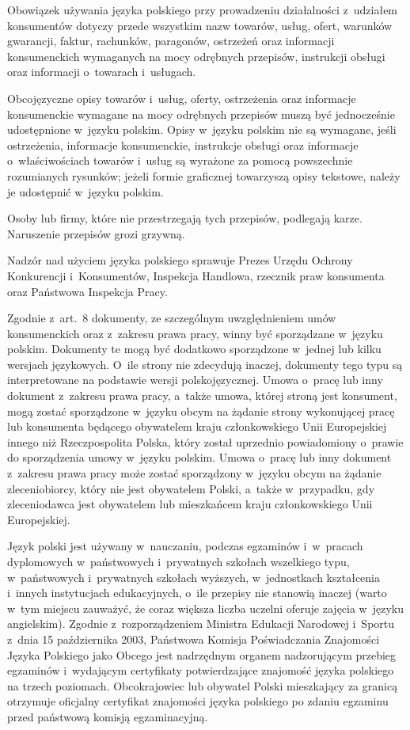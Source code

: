 \begin{multicols}{2}
Obowiązek używania języka polskiego przy prowadzeniu działalności
z~udziałem konsumentów dotyczy przede wszystkim nazw towarów,
usług, ofert, warunków gwarancji, faktur, rachunków, paragonów,
ostrzeżeń oraz informacji konsumenckich wymaganych na mocy
odrębnych przepisów, instrukcji obsługi oraz informacji o~towarach
i~usługach. 


Obcojęzyczne opisy towarów i~usług, oferty, ostrzeżenia oraz
informacje konsumenckie wymagane na mocy odrębnych przepisów muszą
być jednocześnie udostępnione w~języku polskim. Opisy w~języku
polskim nie są wymagane, jeśli ostrzeżenia, informacje
konsumenckie, instrukcje obsługi oraz informacje o~właściwościach
towarów i~usług są wyrażone za pomocą powszechnie rozumianych
rysunków; jeżeli formie graficznej towarzyszą opisy tekstowe,
należy je udostępnić w~języku polskim. 

Osoby lub firmy, które nie przestrzegają tych przepisów, podlegają
karze. Naruszenie przepisów grozi grzywną. 

Nadzór nad użyciem języka polskiego sprawuje Prezes Urzędu Ochrony
Konkurencji i~Konsumentów, Inspekcja Handlowa, rzecznik praw
konsumenta oraz Państwowa Inspekcja Pracy. 

Zgodnie z~art.~8 dokumenty, ze szczególnym uwzględnieniem umów
konsumenckich oraz z~zakresu prawa pracy, winny być sporządzane
w~języku polskim. Dokumenty te mogą być dodatkowo sporządzone
w~jednej lub kilku wersjach językowych. O~ile strony nie zdecydują
inaczej, dokumenty tego typu są interpretowane na podstawie wersji
polskojęzycznej. Umowa o~pracę lub inny dokument z~zakresu prawa
pracy, a~także umowa, której stroną jest konsument, mogą zostać
sporządzone w~języku obcym na żądanie strony wykonującej pracę
lub konsumenta będącego obywatelem kraju członkowskiego Unii
Europejskiej innego niż Rzeczpospolita Polska, który został
uprzednio powiadomiony o~prawie do sporządzenia umowy w~języku
polskim. Umowa o~pracę lub inny dokument z~zakresu prawa pracy może
zostać sporządzony w~języku obcym na żądanie zleceniobiorcy,
który nie jest obywatelem Polski, a~także w~przypadku, gdy
zleceniodawca jest obywatelem lub mieszkańcem kraju członkowskiego
Unii Europejskiej. 

Język polski jest używany w~nauczaniu, podczas egzaminów
i~w~pracach dyplomowych w~państwowych i~prywatnych szkołach
wszelkiego typu, w~państwowych i~prywatnych szkołach wyższych,
w~jednostkach kształcenia i~innych instytucjach edukacyjnych, o~ile
przepisy nie stanowią inaczej (warto w~tym miejscu zauważyć, że
coraz większa liczba uczelni oferuje zajęcia w~języku angielskim).
Zgodnie z~rozporządzeniem Ministra Edukacji Narodowej i~Sportu z~dnia
15 października 2003, Państwowa Komisja Poświadczania Znajomości
Języka Polskiego jako Obcego jest nadrzędnym organem nadzorującym
przebieg egzaminów i~wydającym certyfikaty potwierdzające
znajomość języka polskiego na trzech poziomach. Obcokrajowiec lub
obywatel Polski mieszkający za granicą otrzymuje oficjalny
certyfikat znajomości języka polskiego po zdaniu egzaminu przed
państwową komisją egzaminacyjną. 


\end{multicols}
